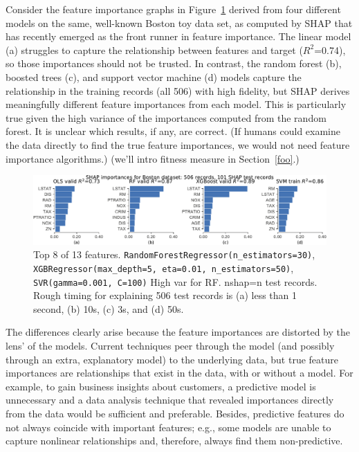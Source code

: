 \documentclass[12pt]{article}
\newcommand{\secref}[1]{Section~\ref{#1}}
\newcommand{\figref}[1]{Figure~\ref{#1}}
\newcommand{\todo}[1]{{{\color{red}{[#1]}}}}
\begin{document}
Consider the feature importance graphs in \figref{fig:diff-models} derived from four different models on the same, well-known Boston toy data set, as computed by SHAP \cite{shap} that has recently emerged as the front runner in feature importance. The linear model (a) struggles to capture the relationship between features and target ($R^2$=0.74), so those importances should not be trusted.  In contrast, the random forest (b), boosted trees (c), and support vector machine (d) models capture the relationship in the training records (all 506) with high fidelity, but SHAP derives meaningfully different feature importances from each model.  This is particularly true given the high variance of the importances computed from the random forest. \todo{explain that} It is unclear which results, if any, are correct. (If humans could examine the data directly to find the true feature importances, we would not need feature importance algorithms.) (we'll intro fitness measure in \secref{foo}.)

\begin{figure}[htbp]
\begin{center}
\includegraphics[scale=0.6]{images/diff-models.pdf}
\caption{Top 8 of 13 features. {\tt\footnotesize RandomForestRegressor(n\_estimators=30)}, {\tt\footnotesize XGBRegressor(max\_depth=5, eta=0.01, n\_estimators=50)}, {\tt\footnotesize SVR(gamma=0.001, C=100)} High var for RF. nshap=n test records. Rough timing for explaining 506 test records is (a) less than 1 second, (b) 10s, (c) 3s, and (d) 50s.}
\label{fig:diff-models}
\end{center}
\end{figure}

The differences clearly arise because the feature importances are distorted by the lens' of the models. Current techniques peer through the model (and possibly through an extra, explanatory model) to the underlying data, but true feature importances are relationships that exist in the data, with or without a model.  For example, to gain business insights about customers, a predictive model is unnecessary and a data analysis technique that revealed importances directly from the data would be sufficient and preferable. \todo{maybe say PCA does this although limited to linear features and assumes most spread = most important?} Besides, predictive features do not always coincide with important features; e.g., some models are unable to capture nonlinear relationships and, therefore, always find them non-predictive.  \todo{last bit redundant?}
 
\end{document}
